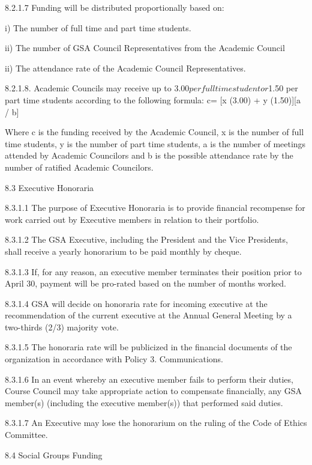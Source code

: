  8.2.1.7 Funding will be distributed proportionally based on: 
 
 
 
 i) The number of full time and part time students. 
 
 ii) The number of GSA Council Representatives from the Academic 
 Council 
 
 ii) The attendance rate of the Academic Council Representatives. 
 
 8.2.1.8. Academic Councils may receive up to $3.00 per full time 
 student or $1.50 per part time students according to the 
 following formula: c= [x (3.00) + y (1.50)][a / b] 
 
 Where c is the funding received by the Academic Council, x is the number 
 of full time students, y is the number of part time students, a is the number 
 of meetings attended by Academic Councilors and b is the possible 
 attendance rate by the number of ratified Academic Councilors. 
 
 
 
 8.3 Executive Honoraria 
 
 8.3.1.1 The purpose of Executive Honoraria is to provide financial 
 recompense for work carried out by Executive members in relation to 
 their portfolio. 
 
 8.3.1.2 The GSA Executive, including the President and the Vice 
 Presidents, shall receive a yearly honorarium to be paid monthly by 
 cheque. 
 
 8.3.1.3 If, for any reason, an executive member terminates their 
 position prior to April 30, payment will be pro-rated based on the 
 number of months worked. 
 
 8.3.1.4 GSA will decide on honoraria rate for incoming executive at the 
 recommendation of the current executive at the Annual General 
 Meeting by a two-thirds (2/3) majority vote. 
 
 8.3.1.5 The honoraria rate will be publicized in the financial documents 
 of the organization in accordance with Policy 3. Communications. 
 
 8.3.1.6 In an event whereby an executive member fails to perform their 
 duties, Course Council may take appropriate action to compensate 
 financially, any GSA member(s) (including the executive member(s)) 
 that performed said duties. 
 
 8.3.1.7 An Executive may lose the honorarium on the ruling of the 
 Code of Ethics Committee. 

 8.4 Social Groups Funding 
 

